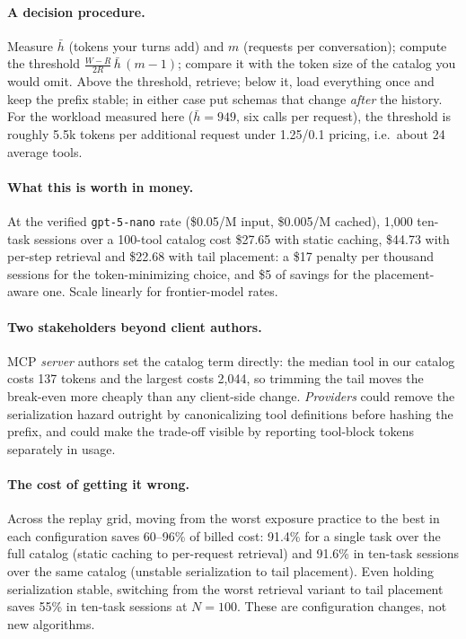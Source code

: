 \documentclass[11pt]{article}
\begin{document}
\paragraph{A decision procedure.} Measure $\bar h$ (tokens your turns add) and $m$ (requests per conversation); compute the threshold $\frac{W-R}{2R}\,\bar h\,(m-1)$; compare it with the token size of the catalog you would omit. Above the threshold, retrieve; below it, load everything once and keep the prefix stable; in either case put schemas that change \emph{after} the history. For the workload measured here ($\bar h = 949$, six calls per request), the threshold is roughly 5.5k tokens per additional request under 1.25/0.1 pricing, i.e.\ about 24 average tools.

\paragraph{What this is worth in money.} At the verified \texttt{gpt-5-nano} rate (\$0.05/M input, \$0.005/M cached), 1,000 ten-task sessions over a 100-tool catalog cost \$27.65 with static caching, \$44.73 with per-step retrieval and \$22.68 with tail placement: a \$17 penalty per thousand sessions for the token-minimizing choice, and \$5 of savings for the placement-aware one. Scale linearly for frontier-model rates.

\paragraph{Two stakeholders beyond client authors.} MCP \emph{server} authors set the catalog term directly: the median tool in our catalog costs 137 tokens and the largest costs 2,044, so trimming the tail moves the break-even more cheaply than any client-side change. \emph{Providers} could remove the serialization hazard outright by canonicalizing tool definitions before hashing the prefix, and could make the trade-off visible by reporting tool-block tokens separately in usage.

\paragraph{The cost of getting it wrong.} Across the replay grid, moving from the worst exposure practice to the best in each configuration saves 60--96\% of billed cost: 91.4\% for a single task over the full catalog (static caching to per-request retrieval) and 91.6\% in ten-task sessions over the same catalog (unstable serialization to tail placement). Even holding serialization stable, switching from the worst retrieval variant to tail placement saves 55\% in ten-task sessions at $N{=}100$. These are configuration changes, not new algorithms.
\end{document}
